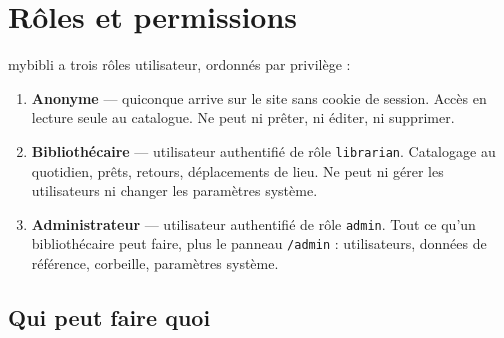 \chapter{Rôles et permissions}
\label{ch:roles}

mybibli a trois rôles utilisateur, ordonnés par
privilège :

\begin{enumerate}
  \item \textbf{Anonyme} — quiconque arrive sur le
        site sans cookie de session. Accès en lecture seule au
        catalogue. Ne peut ni prêter, ni éditer, ni supprimer.
  \item \textbf{Bibliothécaire} — utilisateur
        authentifié de rôle \texttt{librarian}. Catalogage au
        quotidien, prêts, retours, déplacements de lieu. Ne peut
        ni gérer les utilisateurs ni changer les paramètres
        système.
  \item \textbf{Administrateur} — utilisateur
        authentifié de rôle \texttt{admin}. Tout ce qu'un
        bibliothécaire peut faire, plus le panneau \texttt{/admin}
        : utilisateurs, données de référence, corbeille,
        paramètres système.
\end{enumerate}

\section{Qui peut faire quoi}

